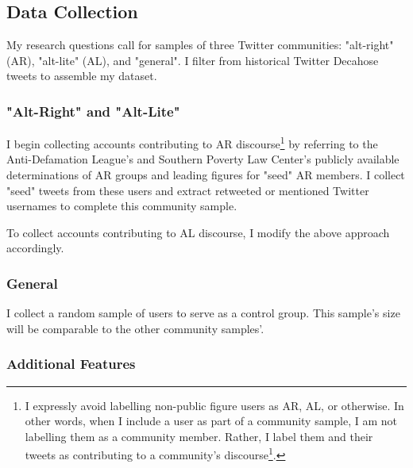 \documentclass[acmlarge, screen, authorversion]{acmart}
\begin{document}
\subsection{Data Collection}

My research questions call for samples of three Twitter communities: "alt-right" (AR), "alt-lite" (AL), and "general". I filter from historical Twitter Decahose tweets to assemble my dataset.

\subsubsection{"Alt-Right" and "Alt-Lite"}

I begin collecting accounts contributing to AR discourse\footnote{I expressly avoid labelling non-public figure users as AR, AL, or otherwise. In other words, when I include a user as part of a community sample, I am not labelling them as a community member. Rather, I label them and their tweets as contributing to a community's discourse\footnote{In some ways, I follow \citet{salazarAltRightCommunityDiscourse2018}'s suggestion to examine the "alt-right" as a \textit{community of discourse}}.
	} by referring to the Anti-Defamation League's \cite{anti-defamationleagueAltRightAlt} and Southern Poverty Law Center's \cite{southernpovertylawcenterAltRight} publicly available determinations of AR groups and leading figures for "seed" AR members. I collect "seed" tweets from these users and extract retweeted or mentioned Twitter usernames to complete this community sample.

To collect accounts contributing to AL discourse, I modify the above approach accordingly.

\subsubsection{General}

I collect a random sample of users to serve as a control group. This sample's size will be comparable to the other community samples'.




\subsubsection{Additional Features}
\end{document}
